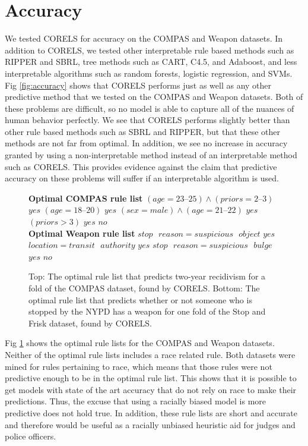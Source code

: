 \section{Accuracy}
We tested CORELS for accuracy on the COMPAS and Weapon datasets.
In addition to CORELS, we tested other interpretable rule based methods such as RIPPER and SBRL, tree methods such as CART, C4.5, and Adaboost, and less interpretable algorithms such as random forests, logistic regression, and SVMs.
Fig \ref{fig:accuracy} shows that CORELS performs just as well as any other predictive method that we tested on the COMPAS and Weapon datasets.
Both of these problems are difficult, so no model is able to capture all of the nuances of human behavior perfectly.
We see that CORELS performs slightly better than other rule based methods such as SBRL and RIPPER, but that these other methods are not far from optimal.
In addition, we see no increase in accuracy granted by using a non-interpretable method instead of an interpretable method such as CORELS.
This provides evidence against the claim that predictive accuracy on these problems will suffer if an interpretable algorithm is used.

\begin{figure}[t!]
\begin{algorithmic}
\normalsize
\State \textbf{Optimal COMPAS rule list}
\State \bif $(age=23\text{--}25) \wedge (priors=2\text{--}3)$ \bthen $yes$
\State \belif $(age=18\text{--}20)$ \bthen $yes$
\State \belif $(sex=male) \wedge (age=21\text{--}22)$ \bthen $yes$
\State \belif $(priors > 3)$ \bthen $yes$
\State \belse $no$\\

\State \textbf{Optimal Weapon rule list}
\State \bif $stop\text{ }reason=suspicious\text{ }object$ \bthen $yes$
\State \belif $location=transit\text{ }authority$ \bthen $yes$
\State \belif $stop\text{ }reason=suspicious\text{ }bulge$ \bthen $yes$
\State \belse $no$
\end{algorithmic}
\caption{Top: The optimal rule list that predicts two-year recidivism for a fold of the COMPAS dataset, found by CORELS.
Bottom: The optimal rule list that predicts whether or not someone who is stopped by the NYPD has a weapon for one fold of the Stop and Frisk dataset, found by CORELS.}
\label{fig:rule-list-optimal}
\end{figure}

Fig \ref{fig:rule-list-optimal} shows the optimal rule lists for the COMPAS and Weapon datasets.
Neither of the optimal rule lists includes a race related rule.
Both datasets were mined for rules pertaining to race, which means that those rules were not predictive enough to be in the optimal rule list.
This shows that it is possible to get models with state of the art accuracy that do not rely on race to make their predictions.
Thus, the excuse that using a racially biased model is more predictive does not hold true.
In addition, these rule lists are short and accurate and therefore would be useful as a racially unbiased heuristic aid for judges and police officers.

